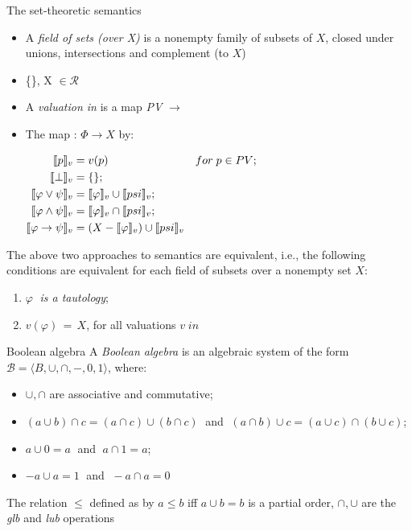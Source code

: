 \documentclass[sans]{beamer}
\begin{document}
\begin{frame}{The set-theoretic semantics}
  \begin{itemize}
    \item A \emph{field of sets (over X)} is a nonempty family \calr
      of subsets of $X$, closed under unions, intersections and complement (to $X$)
    
    \item \{\}, X $\in \mathcal{R}$
    
    \item A \emph{valuation in} \calr is a map \emph{PV} $\to$ \calr
      
    \vfill

    \item The map \vmsem{\bullet} : $\Phi \to X$ by:

      $\begin{aligned}
        \llbracket p \rrbracket_v &= v(p) & for \; p \in PV; \\
        \llbracket \bot \rrbracket_v &= \{\}; \\
        \llbracket \varphi \vee \psi \rrbracket_v &= \llbracket \varphi \rrbracket_v \cup \llbracket psi \rrbracket_v; \\
        \llbracket \varphi \wedge \psi \rrbracket_v &= \llbracket \varphi \rrbracket_v \cap \llbracket psi \rrbracket_v;\\
        \llbracket \varphi \to \psi \rrbracket_v &= (X - \llbracket \varphi \rrbracket_v) \cup \llbracket psi \rrbracket_v
       \end{aligned}$
  \end{itemize}
\end{frame}

\begin{frame}{}
  The above two approaches to semantics are equivalent, i.e., the following conditions
  are equivalent for each field of subsets \calr over a nonempty set $X$:
  \begin{enumerate}
    \item $\varphi \;$ \emph{is a tautology};
    \item $v(\varphi) \,=\, X$, for all valuations $v \; in \; $\calr
  \end{enumerate}
\end{frame}

\begin{frame}{Boolean algebra}
  A \emph{Boolean algebra} is an algebraic system of the form
  $\mathcal{B} = \langle B, \cup, \cap, -, 0, 1\rangle$, where:
  \begin{itemize}
    \item $\cup, \cap$ are associative and commutative;
    \item $(a \cup b) \cap c = (a \cap c) \cup (b \cap c) \;$ and
          $\; (a \cap b) \cup c = (a \cup c) \cap (b \cup c)$;
    \item $a \cup 0 = a \;$ and $\; a \cap 1 = a$;
    \item $-a \cup a = 1 \;$ and $\; -a \cap a = 0\;$
  \end{itemize}

  \vfill
  
  The relation $\leq$ defined as by $a \leq b$ iff $a \cup b = b$ is a partial order,
  $\cap, \cup$ are the \emph{glb} and \emph{lub} operations
\end{frame} 
\end{document}
